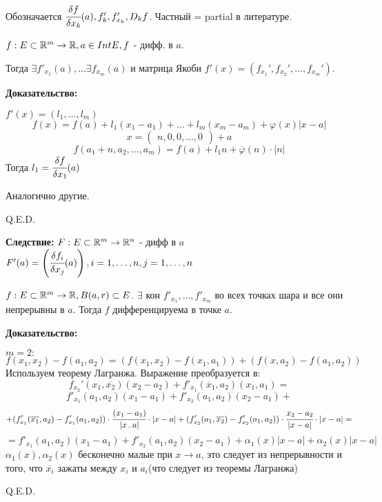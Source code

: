 Обозначается $\cfrac{\delta f}{\delta x_k}(a), f'_k , f'_{x_k},D_kf$. Частный = partial в литературе.


$f: E \subset \mathbb{R}^m \rightarrow \mathbb{R}, a \in Int E, f$ - дифф. в $a$.

Тогда $\exists f'_{x_1}(a) ,\ldots \exists f_{x_m}(a)$ и матрица Якоби $f'(x) = (f_{x_1}',f_{x_2}',\ldots, f_{x_m}')$.

\textbf{Доказательство:}

$f'(x) = (l_1,\ldots, l_m)$
$$f(x) = f(a) + l_1(x_1 - a_1) + \ldots + l_m (x_m - a_m) + \varphi(x) |x-a|$$
$$x = \begin{pmatrix}
    n,0,0,\ldots,0 
\end{pmatrix} + a$$
$$f(a_1 + n, a_2 ,\ldots, a_m) = f(a) + l_1 n + \overline{\varphi}(n)\cdot |n|$$
Тогда $l_1 = \cfrac{\delta f}{\delta x_1}(a)$

Аналогично другие.

\hfill Q.E.D.

\textbf{Следствие:} $F: E \subset \mathbb{R}^m \rightarrow \mathbb{R}^n$ - дифф в $a$
$F'(a) = \left(\cfrac{\delta f_i}{\delta x_j}(a)\right),i = 1,\ldots,n, j = 1,\ldots, n$


$f: E \subset \mathbb{R}^m \rightarrow \mathbb{R}, B(a,r) \subset E$. $\exists$ кон $f'_{x_1},\ldots, f'_{x_m}$ во всех точках шара и все они непрерывны в $a$. Тогда $f$ дифференцируема в точке $a$.

\textbf{Доказательство:}

$m=2:$
$$f(x_1,x_2) - f(a_1,a_2) = (f(x_1,x_2)-f(x_1,a_1))+(f(x,a_2)-f(a_1,a_2))$$
Используем теорему Лагранжа.  Выражение преобразуется в:
$$f_{x_2}'(x_1,\overline{x_2})(x_2-a_2) + f'_{x_1}(\overline{x}_1,a_2)(x_1,a_1) = $$
$$f'_{x_1}(a_1,a_2)(x_1-a_1) + f'_{x_2}(a_1,a_2)(x_2-a_1) + $$$$ + (f'_{x_1}(\overline{x_1}, a_2)-f'_{x_1}(a_1,a_2))\cdot\cfrac{(x_1-a_1)}{|x_-a|}\cdot |x-a| + (f'_{x_2}(a_1,\overline{x_2})-f'_{x_2}(a_1,a_2))\cdot\cfrac{x_2-a_2}{|x-a|}\cdot |x-a| = $$
$$=f'_{x_1}(a_1,a_2)(x_1-a_1) + f'_{x_2}(a_1,a_2)(x_2-a_1) + \alpha_1(x) |x-a| + \alpha_2(x)|x-a|$$
$\alpha_1(x), \alpha_2(x)$ бесконечно малые при $x\rightarrow a$, это следует из непрерывности и того, что $\overline{x_i}$ зажаты между $x_i$ и $a_i$(что следует из теоремы Лагранжа)

\hfill Q.E.D.

\pagebreak

